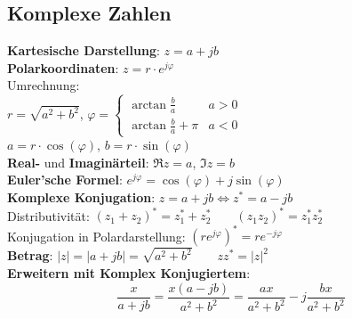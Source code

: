 \documentclass[fs, footer]{latex4ei}
\begin{document}
\begin{multicols*}{4}
{        \subsection{Komplexe Zahlen}
        \textbf{Kartesische Darstellung}: $z = a + j b$\\
        \textbf{Polarkoordinaten}: $z = r \cdot e^{j \varphi}$\\

        Umrechnung:\\
        $r = \sqrt{a^2 + b^2}$, $\varphi = \begin{cases}
                        \arctan\frac{b}{a}     & a>0 \\
                        \arctan\frac{b}{a}+\pi & a<0
                    \end{cases}$\\
        $a = r \cdot \cos(\varphi)$, $b = r \cdot \sin(\varphi)$\\

        \textbf{Real-} und \textbf{Imaginärteil}: $\Re z = a$, $\Im z = b$\\

        \textbf{Euler'sche Formel}: $e^{j \varphi} = \cos(\varphi) + j \sin(\varphi)$\\

        \textbf{Komplexe Konjugation}: $z = a + jb \iff z^* = a - j b$\\
        Distributivität: $(z_1+z_2)^*=z_1^*+z_2^*\qquad (z_1z_2)^*=z_1^*z_2^*$\\
        Konjugation in Polardarstellung: $(r e^{j\varphi})^* = r e^{-j\varphi}$\\

        \textbf{Betrag}: $|z| = |a+jb| = \sqrt{a^2+b^2}\qquad zz^* = |z|^2$\\

        \textbf{Erweitern mit Komplex Konjugiertem}:\\
        \[
        \frac{x}{a+jb} = \frac{x(a-jb)}{a^2+b^2} = \frac{ax}{a^2+b^2} - j\frac{bx}{a^2+b^2}
        \]
    }


\end{multicols*}
\end{document}
